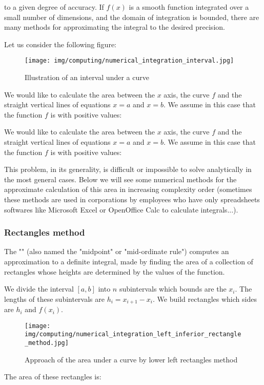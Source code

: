 	to a given degree of accuracy. If $f(x)$ is a smooth function integrated over a small number of dimensions, and the domain of integration is bounded, there are many methods for approximating the integral to the desired precision.
	
	Let us consider the following figure:
	\begin{figure}[H]
		\centering
		\texttt{[image: img/computing/numerical\_integration\_interval.jpg]}
		\caption{Illustration of an interval under a curve}
	\end{figure}
	We would like to calculate the area between the $x$ axis, the curve $f$ and the straight vertical lines of equations $x=a$ and $x=b$. We assume in this case that the function $f$ is with positive values:
	
	We would like to calculate the area between the $x$ axis, the curve $f$ and the straight vertical lines of equations $x=a$ and $x=b$. We assume in this case that the function $f$ is with positive values:
	
	This problem, in its generality, is difficult or impossible to solve analytically in the most general cases. Below we will see some numerical methods for the approximate calculation of this area in increasing complexity order (sometimes these methods are used in corporations by employees who have only spreadsheets softwares like Microsoft Excel or OpenOffice Calc to calculate integrals...).
	
	\subsubsection{Rectangles method}\label{rectangle integration method}
	The "" (also named the "midpoint" or "mid-ordinate rule") computes an approximation to a definite integral, made by finding the area of a collection of rectangles whose heights are determined by the values of the function.
	
	We divide the interval $[a,b]$ into $n$ subintervals which bounds are the $x_i$. The lengths of these subintervals are $h_i=x_{i+1}-x_i$. We build rectangles which sides are $h_i$ and $f(x_i)$.
	
	\begin{figure}[H]
		\centering
		\texttt{[image: img/computing/numerical\_integration\_left\_inferior\_rectangle\_method.jpg]}
		\caption{Approach of the area under a curve by lower left rectangles method}
	\end{figure}
	The area of these rectangles is:
	

